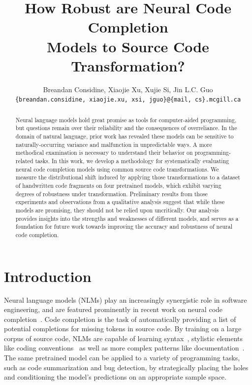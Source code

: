\documentclass[usenames,dvipsnames]{article} %
\title{How Robust are Neural Code Completion\\Models to Source Code Transformation?}
\author{Breandan Considine, Xiaojie Xu, Xujie Si, Jin L.C. Guo\\
\texttt{\{breandan.considine, xiaojie.xu, xsi, jguo\}@\{mail, cs\}.mcgill.ca}\\
}
\begin{document}
  \maketitle

  \begin{abstract}
    Neural language models hold great promise as tools for computer-aided programming, but questions remain over their reliability and the consequences of overreliance. In the domain of natural language, prior work has revealed these models can be sensitive to naturally-occurring variance and malfunction in unpredictable ways. A more methodical examination is necessary to understand their behavior on programming-related tasks. In this work, we develop a methodology for systematically evaluating neural code completion models using common source code transformations. We measure the distributional shift induced by applying those transformations to a dataset of handwritten code fragments on four pretrained models, which exhibit varying degrees of robustness under transformation. Preliminary results from those experiments and observations from a qualitative analysis suggest that while these models are promising, they should not be relied upon uncritically. Our analysis provides insights into the strengths and weaknesses of different models, and serves as a foundation for future work towards improving the accuracy and robustness of neural code completion.
  \end{abstract}

  \section{Introduction}\label{sec:introduction}

  Neural language models (NLMs) play an increasingly synergistic role in software engineering, and are featured prominently in recent work on neural code completion~\citep{chen2021evaluating}. Code completion is the task of automatically providing a list of potential completions for missing tokens in source code. By training on a large corpus of source code, NLMs are capable of learning syntax~\citep{chirkova2020empirical, troshin2022probing}, stylistic elements like coding conventions~\citep{parr2016towards} as well as more complex patterns like documentation~\citep{hu2018deep}. The same pretrained model can be applied to a variety of programming tasks, such as code summarization and bug detection, by strategically placing the holes and conditioning the model's predictions on an appropriate sample space.
\end{document}
